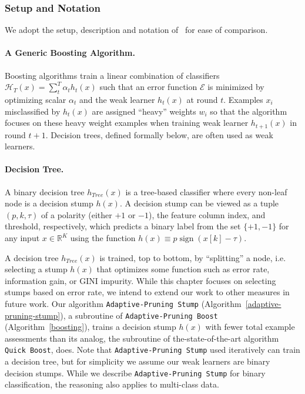 \subsubsection{Setup and Notation}
We adopt the setup, 
description and notation of~\citet{icml2013_appel13} for ease of
comparison.  

\paragraph {A Generic Boosting Algorithm.}
Boosting algorithms train a linear combination of classifiers
$\mathcal{H}_T(x)=\sum^T_t {\alpha_t h_t(x)}$
such that an error function $\mathcal{E}$ is minimized by optimizing scalar
$\alpha_t$ and the weak learner $h_t(x)$ at round $t$.
Examples $x_i$ misclassified by $h_t(x)$ are assigned ``heavy'' weights $w_i$
so that the algorithm focuses on these heavy weight examples when training weak
learner $h_{t+1}(x)$ in round $t+1$.
Decision trees, defined formally below, are often used as weak learners.

\paragraph {Decision Tree.}  A binary decision tree $h_{\textit{Tree}}(x)$ is a
tree-based classifier where every non-leaf node is a decision stump
$h(x)$.  A decision stump can be viewed as a tuple $(p, k, \tau)$ of a
polarity (either $+1$ or $-1$), the feature column index, and
threshold, respectively, which predicts a binary label from the set
$\{+1, -1\}$ for any input $x \in \mathbb{R}^K$ using the function
$h(x) \equiv p\mathop{\mathrm{sign}}(x[k] - \tau)$.

A decision tree $h_{\textit{Tree}}(x)$ is trained, top to bottom, by
``splitting'' a node, i.e. selecting a stump $h(x)$ that optimizes
some function such as error rate, information gain, or GINI impurity.  
While this chapter focuses on selecting stumps based on
error rate, we intend to extend our work to other measures in future work.
Our algorithm \texttt{Adaptive-Pruning Stump} (Algorithm~\ref{adaptive-pruning-stump}), a subroutine of \texttt{Adaptive-Pruning Boost} (Algorithm~\ref{boosting}), trains a decision stump $h(x)$ with
fewer total example assessments than its analog, the subroutine of the-state-of-the-art algorithm
\texttt{Quick Boost}, does. Note that \texttt{Adaptive-Pruning Stump} used iteratively can train a decision tree, but for simplicity we assume our weak learners are binary decision stumps.
While we describe \texttt{Adaptive-Pruning Stump} for
binary classification, the reasoning also applies to multi-class data.

